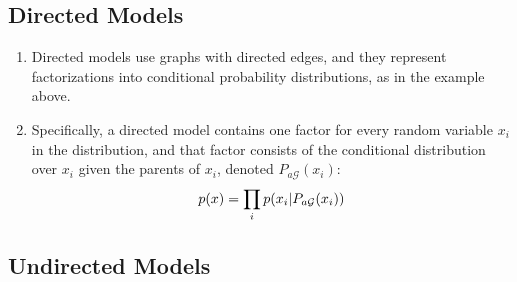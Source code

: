 \subsection{Directed Models \cite{dnn-deep-learning-ian}}

\begin{enumerate}
    \item Directed models use graphs with directed edges, and they represent factorizations into conditional probability distributions, as in the example above.

    \item Specifically, a directed model contains one factor for every random variable $x_i$ in the distribution, and that factor consists of the conditional distribution over $x_i$ given the parents of $x_i$, denoted $P_{a\mathcal{G}}(x_i)$:
    \[
        p(x)
        = \displaystyle\prod_i p(x_i | P_{a\mathcal{G}}(x_i))
    \]
\end{enumerate}


\subsection{Undirected Models \cite{dnn-deep-learning-ian}}

